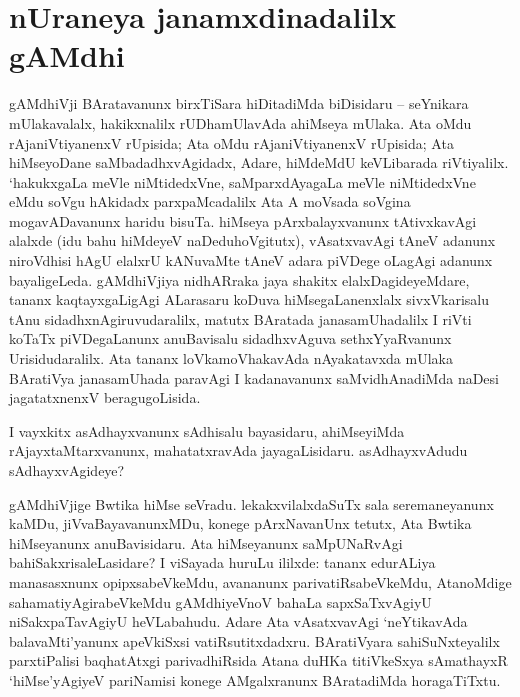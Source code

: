 \makeatletter
\def\@makechapterhead#1{%
  \vspace*{10\p@}%
{\fontsize{13pt}{13pt}\selectfont\raggedright{\bf  kArflx jAsapxrf}\par}
\vspace*{25\p@}%
  {\parindent \z@ \centering \normalfont
    \ifnum \c@secnumdepth >\m@ne
      \if@mainmatter
        {\LARGE\bfseries  #1}\par\nobreak
	\vskip 4pt
      \fi
    \fi
\smallskip 

 \vskip 10\p@  
{\fontsize{12pt}{12pt}\selectfont\raggedleft{anu: \bf pu.ti.na.}\par}
  }
\vskip 40\p@}
\makeatother


\chapter{nUraneya janamxdinadalilx gAMdhi}\label{chap1}


gAMdhiVji BAratavanunx birxTiSara hiDitadiMda biDisidaru -- seYnikara mUlakavalalx, hakikxnalilx rUDhamUlavAda ahiMseya mUlaka. Ata oMdu rAjaniVtiyanenxV rUpisida; Ata oMdu rAjaniVtiyanenxV rUpisida; Ata hiMseyoDane saMbadadhxvAgidadx, Adare, hiMdeMdU keVLibarada riVtiyalilx. `hakukxgaLa meVle niMtidedxVne, saMparxdAyagaLa meVle niMtidedxVne eMdu soVgu hAkidadx parxpaMcadalilx Ata A moVsada soVgina mogavADavanunx haridu bisuTa. hiMseya pArxbalayxvanunx tAtivxkavAgi alalxde (idu bahu hiMdeyeV naDeduhoVgitutx), vAsatxvavAgi tAneV adanunx niroVdhisi hAgU elalxrU kANuvaMte tAneV adara piVDege oLagAgi adanunx bayaligeLeda. gAMdhiVjiya nidhARraka jaya shakitx elalxDagideyeMdare, tananx kaqtayxgaLigAgi ALarasaru koDuva hiMsegaLanenxlalx sivxVkarisalu tAnu sidadhxnAgiruvudaralilx, matutx BAratada janasamUhadalilx I riVti koTaTx piVDegaLanunx anuBavisalu sidadhxvAguva sethxYyaRvanunx Urisidudaralilx. Ata tananx loVkamoVhakavAda nAyakatavxda mUlaka BAratiVya janasamUhada paravAgi I kadanavanunx saMvidhAnadiMda naDesi jagatatxnenxV beragugoLisida.

I vayxkitx asAdhayxvanunx sAdhisalu bayasidaru, ahiMseyiMda rAjayxtaMtarxvanunx, mahatatxravAda jayagaLisidaru. asAdhayxvAdudu sAdhayxvAgideye?

gAMdhiVjige Bwtika hiMse seVradu. lekakxvilalxdaSuTx sala seremaneyanunx kaMDu, jiVvaBayavanunxMDu, konege pArxNavanUnx tetutx, Ata Bwtika hiMseyanunx anuBavisidaru. Ata hiMseyanunx saMpUNaRvAgi bahiSakxrisaleLasidare? I viSayada huruLu ililxde: tananx edurALiya manasasxnunx opipxsabeVkeMdu, avananunx parivatiRsabeVkeMdu, AtanoMdige sahamatiyAgirabeVkeMdu gAMdhiyeVnoV bahaLa sapxSaTxvAgiyU niSakxpaTavAgiyU heVLabahudu. Adare Ata vAsatxvavAgi `neYtikavAda balavaMti'yanunx apeVkiSxsi vatiRsutitxdadxru. BAratiVyara sahiSuNxteyalilx parxtiPalisi baqhatAtxgi parivadhiRsida Atana duHKa titiVkeSxya sAmathayxR `hiMse'yAgiyeV pariNamisi konege AMgalxranunx BAratadiMda horagaTiTxtu.

